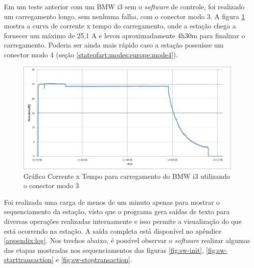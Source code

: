     Em um teste anterior com um BMW i3 sem o \textit{software} de controle, foi realizado um carregamento longo, sem nenhuma falha, com o conector modo 3. A figura \ref{fig:evse-charge} mostra a curva de corrente x tempo do carregamento, onde a estação chega a fornecer um máximo de 25,1 A e levou aproximadamente 4h30m para finalizar o carregamento. Poderia ser ainda mais rápido caso a estação possuísse um conector modo 4 (seção \ref{stateofart:modes:europe:mode4}).

    \begin{figure}[H]
      \begin{center}
        \includegraphics[width=\textwidth,natwidth=1420,natheight=2130]{assets/images/evse-charge.png}
        \caption{Gráfico Corrente x Tempo para carregamento do BMW i3 utilizando o conector modo 3}
        \label{fig:evse-charge}
      \end{center}
    \end{figure}

    Foi realizada uma carga de menos de um minuto apenas para mostrar o sequenciamento da estação, visto que o programa gera saídas de texto para diversas operações realizadas internamente e isso permite a visualização do que está ocorrendo na estação. A saída completa está disponível no apêndice \ref{appendix:log}. Nos trechos abaixo, é possível observar o \textit{software} realizar algumas das etapas mostradas nos sequenciamentos das figuras \ref{fig:sw-init}, \ref{fig:sw-starttransaction} e \ref{fig:sw-stoptransaction}.


